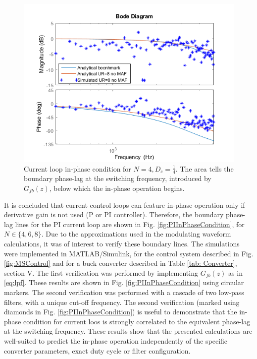 \documentclass[journal]{IEEEtran}
\begin{document}
\begin{figure}[t!]
    \centerline{\includegraphics[width=0.95\linewidth]{figures/nasb_clfra.png}}
    \caption{Current loop in-phase condition for $N = 4, D_c = \frac{1}{4}$. The area tells the boundary phase-lag at the switching frequency, introduced by $G_{fb}(z)$, below which the in-phase operation begins.}
    \label{fig:N4InPhaseCondition}    
\end{figure}

It is concluded that current control loops can feature in-phase operation only if derivative gain is not used (P or PI controller). 
Therefore, the boundary phase-lag lines for the PI current loop are shown in Fig. \ref{fig:PIInPhaseCondition}, for $N \in \{4,6,8\}$. Due to the approximations used in the modulating waveform calculations, it was of interest to verify these boundary lines. The simulations were implemented in MATLAB/Simulink, for the control system described in Fig. \ref{fig:MSControl} and for a buck converter described in Table \ref{tab: Converter}, section V. The first verification was performed by implementing $G_{fb}(z)$ as in \eqref{eq:lpf}. These results are shown in Fig. \ref{fig:PIInPhaseCondition} using circular markers. The second verification was performed with a cascade of two low-pass filters, with a unique cut-off frequency. The second verification (marked using diamonds in Fig. \ref{fig:PIInPhaseCondition}) is useful to demonstrate that the in-phase condition for current loos is strongly correlated to the equivalent phase-lag at the switching frequency. These results show that the presented calculations are well-suited to predict the in-phase operation independently of the specific converter parameters, exact duty cycle or filter configuration.
\end{document}

